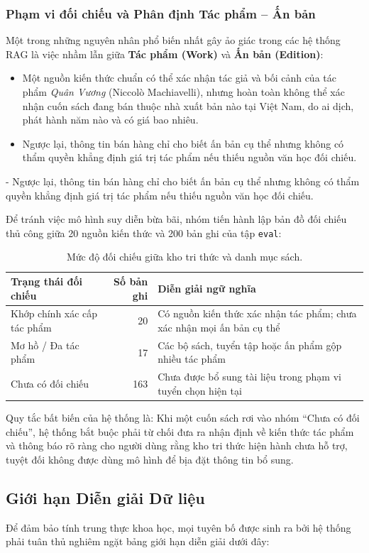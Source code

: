 \subsubsection{Phạm vi đối chiếu và Phân định Tác phẩm -- Ấn bản}
Một trong những nguyên nhân phổ biến nhất gây ảo giác trong các hệ thống RAG là việc nhầm lẫn giữa \textbf{Tác phẩm (Work)} và \textbf{Ấn bản (Edition)}:
\begin{itemize}
    \item Một nguồn kiến thức chuẩn có thể xác nhận tác giả và bối cảnh của tác phẩm \textit{Quân Vương} (Niccolò Machiavelli), nhưng hoàn toàn không thể xác nhận cuốn sách đang bán thuộc nhà xuất bản nào tại Việt Nam, do ai dịch, phát hành năm nào và có giá bao nhiêu.
    \item Ngược lại, thông tin bán hàng chỉ cho biết ấn bản cụ thể nhưng không có thẩm quyền khẳng định giá trị tác phẩm nếu thiếu nguồn văn học đối chiếu.
\end{itemize}
- Ngược lại, thông tin bán hàng chỉ cho biết ấn bản cụ thể nhưng không có thẩm quyền khẳng định giá trị tác phẩm nếu thiếu nguồn văn học đối chiếu.

Để tránh việc mô hình suy diễn bừa bãi, nhóm tiến hành lập bản đồ đối chiếu thủ công giữa 20 nguồn kiến thức và 200 bản ghi của tập \texttt{eval}:

\begin{table}[htbp]\small
\caption{Mức độ đối chiếu giữa kho tri thức và danh mục sách.}
\begin{tabularx}{\linewidth}{YrY}\toprule
Trạng thái đối chiếu & Số bản ghi & Diễn giải ngữ nghĩa\\\midrule
Khớp chính xác cấp tác phẩm & 20 & Có nguồn kiến thức xác nhận tác phẩm; chưa xác nhận mọi ấn bản cụ thể\\
Mơ hồ / Đa tác phẩm & 17 & Các bộ sách, tuyển tập hoặc ấn phẩm gộp nhiều tác phẩm\\
Chưa có đối chiếu & 163 & Chưa được bổ sung tài liệu trong phạm vi tuyển chọn hiện tại\\\bottomrule
\end{tabularx}
\end{table}

Quy tắc bất biến của hệ thống là: Khi một cuốn sách rơi vào nhóm ``Chưa có đối chiếu'', hệ thống bắt buộc phải từ chối đưa ra nhận định về kiến thức tác phẩm và thông báo rõ ràng cho người dùng rằng kho tri thức hiện hành chưa hỗ trợ, tuyệt đối không được dùng mô hình để bịa đặt thông tin bổ sung.

\subsection{Giới hạn Diễn giải Dữ liệu}
Để đảm bảo tính trung thực khoa học, mọi tuyên bố được sinh ra bởi hệ thống phải tuân thủ nghiêm ngặt bảng giới hạn diễn giải dưới đây:


